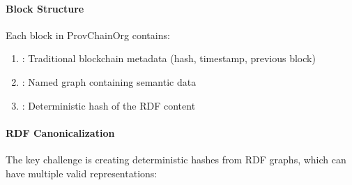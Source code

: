 \documentclass[letterpaper,10pt,english]{sphinxmanual}
\begin{document}
\paragraph{Block Structure}
\label{\detokenize{foundational/intro-to-rdf-blockchain:block-structure}}
\sphinxAtStartPar
Each block in ProvChainOrg contains:
\begin{enumerate}
%
\item {} 
\sphinxAtStartPar
{}: Traditional blockchain metadata (hash, timestamp, previous block)

\item {} 
\sphinxAtStartPar
{}: Named graph containing semantic data

\item {} 
\sphinxAtStartPar
{}: Deterministic hash of the RDF content

\end{enumerate}

\begin{sphinxVerbatim}[commandchars=\\\{\}]
\end{sphinxVerbatim}


\paragraph{RDF Canonicalization}
\label{\detokenize{foundational/intro-to-rdf-blockchain:rdf-canonicalization}}
\sphinxAtStartPar
The key challenge is creating deterministic hashes from RDF graphs, which can have multiple valid representations:

\begin{sphinxVerbatim}[commandchars=\\\{\}]

   
              

   
   
\end{sphinxVerbatim}
\end{document}
